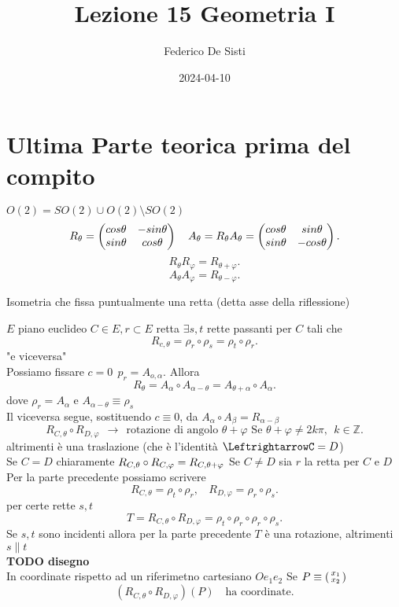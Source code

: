 \documentclass[12px]{article}
\title{Lezione 15 Geometria I}
\date{2024-04-10}
\author{Federico De Sisti}
\begin{document}
	\maketitle
	\newpage
	\section{Ultima Parte teorica prima del compito}
	$O(2) = SO(2) \cup O(2)\setminus SO(2)$
	\[
		R_\theta = \begin{pmatrix}cos\theta & -sin\theta\\ sin\theta& cos\theta\end{pmatrix}\ \ \ A_\theta = R_\theta A_\theta = \begin{pmatrix}cos\theta& sin\theta\\ sin\theta & -cos\theta\end{pmatrix}
	.\] 
	\[
		R_\theta R_\varphi = R_{\theta + \varphi}
	.\] 
	\[
		A_\theta A_ \varphi = R_{\theta - \varphi}
	.\] 
	\begin{defi}[Riflessione]
		Isometria che fissa puntualmente una retta (detta asse della riflessione)
	\end{defi}
	$E$ piano euclideo
	$C\in E, r\subset E$ retta $\exists s,t$ rette passanti per $C$ tali che
	\[
	 R_{c,\theta} = \rho_r \circ\rho_s = \rho_t\circ\rho_r	.\] 
	"e viceversa"\\
	Possiamo fissare $c = 0 \ \ p_r = A_{o,\alpha}.$ Allora
	\[
		R_\theta = A_\alpha\circ A_{\alpha - \theta} = A_{\theta + \alpha}\circ A_\alpha
	.\] 
	dove $\rho_r = A_\alpha$ e $A_{\alpha - \theta} \equiv \rho_s$
\\
Il viceversa segue, sostituendo $c\equiv 0$, da $A_\alpha\circ A_\beta = R_{\alpha - \beta}$
 \[
	 R_{C,\theta}\circ R_{D,\varphi} \ \ \rightarrow \ \ \text{rotazione di angolo } \theta + \varphi \text{ Se } \theta + \varphi\neq 2k\pi,\ \ k\in \mathbb{Z}
.\] 
altrimenti è una traslazione (che è l'identità $ \LeftrightarrowC = D$)\\
Se $C = D$ chiaramente $R_{C,\theta}\circ R_{C, \varphi} = R_{C,\theta + \varphi}\\$
Se $C \neq D$ sia $r$ la retta per $C$ e $D$ Per la parte precedente possiamo scrivere
\[
	R_{C,\theta} = \rho_t\circ\rho_r, \ \ \ \ R_{D,\varphi} = \rho_r\circ\rho_s
.\] 
per certe rette $s,t$ 
\[
	T = R_{C,\theta}\circ R_{D,\varphi} = \rho_t\circ\rho_r\circ\rho_r\circ\rho_s
.\] 
Se $s,t$ sono incidenti allora per la parte precedente $T$ è una rotazione, altrimenti $s\parallel t$\\
\textbf{TODO disegno}\\
In coordinate rispetto ad un riferimetno cartesiano $Oe_1e_2$ Se $P\equiv\left(\begin{smallmatrix}x_1\\x_2\end{smallmatrix}\right)$ 
\[
	(R_{C,\theta}\circ R_{D,\varphi})(P) \ \ \ \text{ ha coordinate}
.\] 
\end{document}
